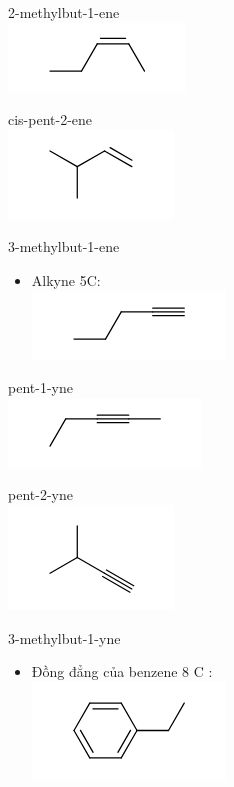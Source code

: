 \documentclass[10pt]{article}
\begin{document}
2-methylbut-1-ene\\
\includegraphics{smile-e63164adf66508c18c67321e7d13df249fd4156a}

cis-pent-2-ene\\
\includegraphics{smile-52cdad411f730e00ab18ae851a1ba552d8df1c3b}

3-methylbut-1-ene

\begin{itemize}
  \item Alkyne 5C:\\
\includegraphics{smile-dd8457a7758b932a36c768d082994d70c31d7f6b}
\end{itemize}

pent-1-yne\\
\includegraphics{smile-68f841a60f7fa96a58870a6949b534cac7ac2bd5}

pent-2-yne\\
\includegraphics{smile-aec80ec7eaa908d3348e0d40f644907da106a496}

3-methylbut-1-yne

\begin{itemize}
  \item Đồng đẳng của benzene 8 C :\\
\includegraphics{smile-138c8f8dffe228bece51de15f6355cf29679262b}
\end{itemize}
\end{document}
